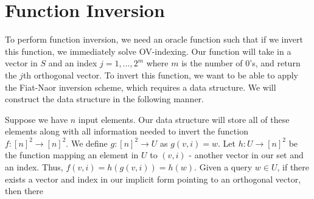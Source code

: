 \documentclass{article}
\begin{document}
\section{Function Inversion}
\label{sec:funcinversion}
To perform function inversion, we need an oracle function such that if we invert this function, we immediately solve OV-indexing. Our function will take in a vector in $S$ and an index $j = 1,...,2^m$ where $m$ is the number of 0's, and return the $j$th orthogonal vector. To invert this function, we want to be able to apply the Fiat-Naor inversion scheme, which requires a data structure. We will construct the data structure in the following manner.

Suppose we have $n$ input elements. Our data structure will store all of these elements along with all information needed to invert the function $f: [n]^2 \rightarrow [n]^2$. We define $g: [n]^2 \rightarrow U$ as $g(v,i) = w$. Let $h: U \rightarrow [n]^2$ be the function mapping an element in $U$ to $(v,i)$ - another vector in our set and an index. Thus, $f(v,i) = h(g(v,i)) = h(w)$. Given a query $w \in U$, if there exists a vector and index in our implicit form pointing to an orthogonal vector, then there 
\end{document}
